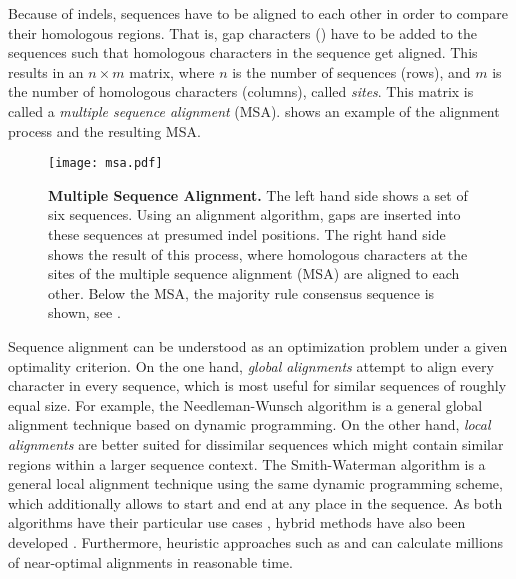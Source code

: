 Because of indels, sequences have to be aligned to each other in order to compare their homologous regions.
That is, gap characters (\nucleobase{-}) have to be added to the sequences
such that homologous characters in the sequence get aligned.
This results in an $n \times m$ matrix,
where $n$ is the number of sequences (rows),
and $m$ is the number of homologous characters (columns), called \emph{sites}.
This matrix is called a \emph{multiple sequence alignment} (MSA).
 shows an example of the alignment process and the resulting MSA.

\begin{figure}[hpbt]
    \centering
    \texttt{[image: msa.pdf]}
    \caption[Multiple Sequence Alignment]{
        \textbf{Multiple Sequence Alignment.}
        The left hand side shows a set of six sequences.
        Using an alignment algorithm, gaps are inserted into these sequences at presumed indel positions.
        The right hand side shows the result of this process,
        where homologous characters at the sites of the multiple sequence alignment (MSA) are aligned to each other.
        Below the MSA, the majority rule consensus sequence is shown,
        see .
    }
    \label{fig:msa}
\end{figure}

Sequence alignment can be understood as an optimization problem under a given optimality criterion.
On the one hand, \emph{global alignments} attempt to align every character in every sequence,
which is most useful for similar sequences of roughly equal size.
For example, the Needleman-Wunsch algorithm \cite{Needleman1970} is a general global alignment technique
based on dynamic programming.
On the other hand, \emph{local alignments} are better suited for dissimilar sequences
which might contain similar regions within a larger sequence context.
The Smith-Waterman algorithm \cite{Smith1981} is a general local alignment technique
using the same dynamic programming scheme,
which additionally allows to start and end at any place in the sequence.
As both algorithms have their particular use cases \cite{Polyanovsky2011},
hybrid methods have also been developed \cite{Brudno2003}.
Furthermore, heuristic approaches such as  \cite{Altschul1990} and
 \cite{Edgar2010} can calculate millions of near-optimal alignments in reasonable time.

